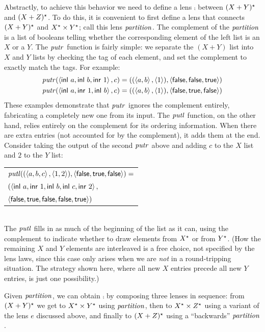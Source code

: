 Abstractly, to achieve this behavior we need to define a lens $\comp$
between $(X+Y)^\star$ and
$(X+Z)^\star$.  To do this, it is convenient to first define a lens that
connects $(X+Y)^\star$ and $X^\star \times Y^\star$; call this lens $\mathit{partition}$.
The complement of the $\mathit{partition}$ is a list of booleans telling whether the
corresponding element of the left list is an $X$ or a $Y$. The $\mathit{putr}$
function is fairly simple: we separate the $(X+Y)$ list into $X$ and $Y$
lists by checking the tag of each element, and set the complement to exactly
match the tags. For example:
\begin{align*}
\mathit{putr}(\left<\mathsf{inl}\  a,\mathsf{inl}\  b,\mathsf{inr}\  1\right>,c) &=
    ((\left<a,b\right>,\left<1\right>),\left<\mathsf{false},\mathsf{false},\mathsf{true}\right>) \\
\mathit{putr}(\left<\mathsf{inl}\  a,\mathsf{inr}\  1,\mathsf{inl}\  b\right>,c) &=
    ((\left<a,b\right>,\left<1\right>),\left<\mathsf{false},\mathsf{true},\mathsf{false}\right>)
\end{align*}
These examples demonstrate that $\mathit{putr}$ ignores the complement entirely,
fabricating a completely new one from its input. The $\mathit{putl}$ function, on
the other hand, relies entirely on the complement for its ordering
information. When there are extra entries (not accounted for by the
complement), it adds them at the
end. Consider taking the output of the second $\mathit{putr}$ above and
adding $c$ to the $X$ list and $2$ to the $Y$ list:
\\[1.5ex]
\noindent\begin{tabular}{l}
$\mathit{putl}((\left<a,b,c\right>,\left<1,2\right>),\left<\mathsf{false},\mathsf{true},\mathsf{false}\right>) =$ \\
\qquad$(\left<\mathsf{inl}\  a,\mathsf{inr}\  1,\mathsf{inl}\  b,\mathsf{inl}\  c,\mathsf{inr}\  2\right>,$ \\
\qquad$\left<\mathsf{false},\mathsf{true},\mathsf{false},\mathsf{false},\mathsf{true}\right>)$
\end{tabular}
\\[1.5ex]
\noindent The $\mathit{putl}$ fills in as much of the beginning of the list as it
can, using the complement to indicate whether to draw elements from $X^\star$
or from $Y^\star$.  (How the remaining $X$ and $Y$ elements are interleaved
is a free choice, not specified by the lens laws, since this case only
arises when we are {\em not} in a round-tripping situation. The strategy
shown here, where all new $X$ entries precede all new $Y$ entries, is just
one possibility.)

Given $\mathit{partition}$, we can obtain $\comp$ by composing three lenses in
sequence: from $(X+Y)^\star$ we get to $X^\star \times Y^\star$ using
$\mathit{partition}$, then to $X^\star \times Z^\star$ using a variant of the lens $e$
discussed above, and finally to $(X+Z)^\star$ using a ``backwards''
$\mathit{partition}$.

